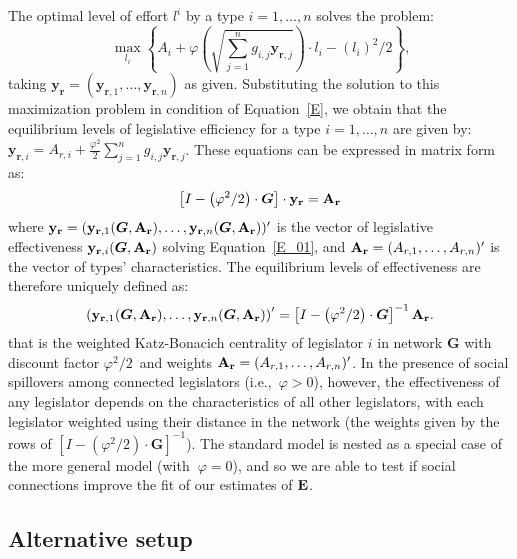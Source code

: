 \documentclass[nojss]{jss}
\begin{document}
The optimal level of effort $l^{i}$ by a type $i=1,\dots,n$ solves the
problem:
%
\begin{equation*}
\max\limits_{l_{i}}\left\{ A_{i}+\varphi \left(
\sqrt{\sum_{j=1}^{n}g_{i,j}\mathbf{y}_{\mathbf{r}, j}}\right) \cdot
l_{i}-\left( l_{i}\right) ^{2}/2\right\} \text{,} \label{E_0}
\end{equation*}%
%
taking $\mathbf{y}_{\mathbf{r}}=(\mathbf{y}_{\mathbf{r},
1},\dots,\mathbf{y}_{\mathbf{r}, n})$ as given.  Substituting the solution to
this maximization problem in condition of Equation~\ref{E}, we obtain that the
equilibrium levels of legislative efficiency for a type $i=1,\dots ,n$ are
given by: $\mathbf{y}_{\mathbf{r}, i}=A_{r, i}+\frac{\varphi
^{2}}{2}\sum_{j=1}^{n}g_{i,j}\mathbf{y}_{\mathbf{r}, j}$.  These equations
can be expressed in matrix form as:%
%
\begin{equation}
\left[ I-\left( \varphi ^{2}/2\right) \cdot \boldsymbol{G}\right] \cdot \mathbf{y}_{\mathbf{r}}={\bf A_r}
\label{E_01}
\end{equation}%
%
where $\mathbf{y}_{\mathbf{r}}=(\mathbf{y}_{\mathbf{r},
1}(\boldsymbol{G},{\bf A_r}),\dots,\mathbf{y}_{\mathbf{r},
n}(\boldsymbol{G},{\bf A_r}))^{\prime }$ is the vector of legislative
effectiveness $\mathbf{y}_{\mathbf{r}, i}(\boldsymbol{G},{\bf A_r})$ solving
Equation~\ref{E_01}, and ${\bf A_r}=(A_{r,1},\dots ,A_{r,n})^{\prime}$ is the vector
of types' characteristics.  The equilibrium levels of effectiveness are
therefore uniquely defined as:
%
\[
{\bf (}\mathbf{y}_{\mathbf{r}, 1}(\boldsymbol{G},{\bf
A_r}),\dots,\mathbf{y}_{\mathbf{r}, n}(\boldsymbol{G},{\bf A_r}){\bf
)}^{\prime }=\left[ I-\left( \varphi ^{2}/2\right) \cdot
\boldsymbol{G}\right] ^{-1}{\bf A_r.}
\]%
%
that is the weighted Katz-Bonacich centrality of legislator $i$ in network
$\boldsymbol{G} $ with discount factor $\varphi ^{2}/2$\ and weights ${\bf
A_r}=(A_{r,1},\dots,A_{r,n})^{\prime}$.  In the presence of social
spillovers among connected legislators (i.e.,~$\varphi >0$), however, the
effectiveness of any legislator depends on the characteristics of all other
legislators, with each legislator weighted using their distance in the
network (the weights given by the rows of $\left[I-\left( \varphi
^{2}/2\right) \cdot \boldsymbol{G}\right] ^{-1}$).  The standard model is
nested as a special case of the more general model (with{\bf \ }$\varphi
=0$), and so we are able to test if social connections improve the fit of
our estimates of ${\bf E}$.

\subsection{Alternative setup}\label{sec:alternative}
\end{document}
